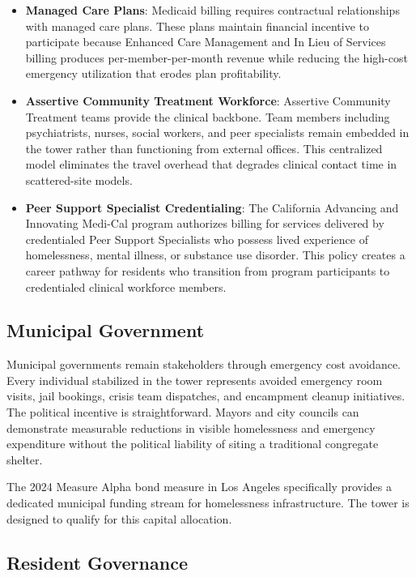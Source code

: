 \documentclass[12pt, letterpaper]{article}
\begin{document}
\begin{itemize}
    \item \textbf{Managed Care Plans}: Medicaid billing requires contractual relationships with managed care plans. These plans maintain financial incentive to participate because Enhanced Care Management and In Lieu of Services billing produces per-member-per-month revenue while reducing the high-cost emergency utilization that erodes plan profitability.
    \item \textbf{Assertive Community Treatment Workforce}: Assertive Community Treatment teams provide the clinical backbone. Team members including psychiatrists, nurses, social workers, and peer specialists remain embedded in the tower rather than functioning from external offices. This centralized model eliminates the travel overhead that degrades clinical contact time in scattered-site models.
    \item \textbf{Peer Support Specialist Credentialing}: The California Advancing and Innovating Medi-Cal program authorizes billing for services delivered by credentialed Peer Support Specialists who possess lived experience of homelessness, mental illness, or substance use disorder. This policy creates a career pathway for residents who transition from program participants to credentialed clinical workforce members.
\end{itemize}

\subsection{Municipal Government}

Municipal governments remain stakeholders through emergency cost avoidance. Every individual stabilized in the tower represents avoided emergency room visits, jail bookings, crisis team dispatches, and encampment cleanup initiatives. The political incentive is straightforward. Mayors and city councils can demonstrate measurable reductions in visible homelessness and emergency expenditure without the political liability of siting a traditional congregate shelter.

The 2024 Measure Alpha bond measure in Los Angeles specifically provides a dedicated municipal funding stream for homelessness infrastructure. The tower is designed to qualify for this capital allocation.

\subsection{Resident Governance}
\end{document}
